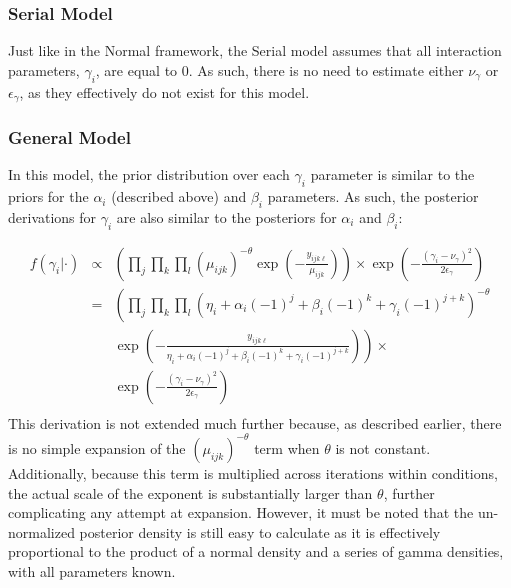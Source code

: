 \subsubsection{Serial Model}
Just like in the Normal framework, the Serial model assumes that all
interaction parameters, $\gamma_i$, are equal to 0.  As such, there is
no need to estimate either $\nu_\gamma$ or $\epsilon_\gamma$, as they
effectively do not exist for this model.\\

\subsubsection{General Model}
In this model, the prior distribution over each $\gamma_i$ parameter
is similar to the priors for the $\alpha_i$ (described above) and
$\beta_i$ parameters.  As such, the posterior derivations for
$\gamma_i$ are also similar to the posteriors for $\alpha_i$ and
$\beta_i$:

\begin{eqnarray*}
\displaystyle{f(\gamma_i|\cdot)}&\propto&\displaystyle{\left(\prod_j\prod_k\prod_l(\mu_{ijk})^{-\theta}\exp\left(-\frac{y_{ijk\ell}}{\mu_{ijk}}\right)\right)\times\exp\left(-\frac{(\gamma_i-\nu_\gamma)^2}{2\epsilon_\gamma}\right)}\\
&=&\displaystyle{\left(\prod_j\prod_k\prod_l(\eta_i + \alpha_i\left(-1\right)^j + \beta_i \left(-1\right)^k + \gamma_i \left(-1\right)^{j+k})^{-\theta}\right.}\\
&&\displaystyle{\left.\exp\left(-\frac{y_{ijk\ell}}{\eta_i + \alpha_i\left(-1\right)^j + \beta_i \left(-1\right)^k + \gamma_i \left(-1\right)^{j+k}}\right)\right)\times}\\
&&\displaystyle{\exp\left(-\frac{(\gamma_i-\nu_\gamma)^2}{2\epsilon_\gamma}\right)}\\
\end{eqnarray*}
This derivation is not extended much further because, as described
earlier, there is no simple expansion of the $(\mu_{ijk})^{-\theta}$
term when $\theta$ is not constant.  Additionally, because this term
is multiplied across iterations within conditions, the actual scale of
the exponent is substantially larger than $\theta$, further
complicating any attempt at expansion.  However, it must be noted that
the un-normalized posterior density is still easy to calculate as it
is effectively proportional to the product of a normal density and a
series of gamma densities, with all parameters known.


